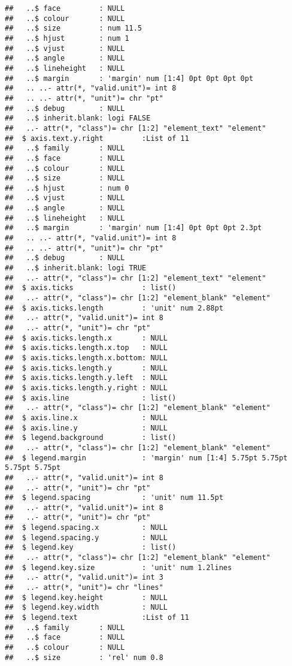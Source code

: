 \documentclass[
]{article}
\begin{document}
\begin{verbatim}
##   ..$ face         : NULL
##   ..$ colour       : NULL
##   ..$ size         : num 11.5
##   ..$ hjust        : num 1
##   ..$ vjust        : NULL
##   ..$ angle        : NULL
##   ..$ lineheight   : NULL
##   ..$ margin       : 'margin' num [1:4] 0pt 0pt 0pt 0pt
##   .. ..- attr(*, "valid.unit")= int 8
##   .. ..- attr(*, "unit")= chr "pt"
##   ..$ debug        : NULL
##   ..$ inherit.blank: logi FALSE
##   ..- attr(*, "class")= chr [1:2] "element_text" "element"
##  $ axis.text.y.right         :List of 11
##   ..$ family       : NULL
##   ..$ face         : NULL
##   ..$ colour       : NULL
##   ..$ size         : NULL
##   ..$ hjust        : num 0
##   ..$ vjust        : NULL
##   ..$ angle        : NULL
##   ..$ lineheight   : NULL
##   ..$ margin       : 'margin' num [1:4] 0pt 0pt 0pt 2.3pt
##   .. ..- attr(*, "valid.unit")= int 8
##   .. ..- attr(*, "unit")= chr "pt"
##   ..$ debug        : NULL
##   ..$ inherit.blank: logi TRUE
##   ..- attr(*, "class")= chr [1:2] "element_text" "element"
##  $ axis.ticks                : list()
##   ..- attr(*, "class")= chr [1:2] "element_blank" "element"
##  $ axis.ticks.length         : 'unit' num 2.88pt
##   ..- attr(*, "valid.unit")= int 8
##   ..- attr(*, "unit")= chr "pt"
##  $ axis.ticks.length.x       : NULL
##  $ axis.ticks.length.x.top   : NULL
##  $ axis.ticks.length.x.bottom: NULL
##  $ axis.ticks.length.y       : NULL
##  $ axis.ticks.length.y.left  : NULL
##  $ axis.ticks.length.y.right : NULL
##  $ axis.line                 : list()
##   ..- attr(*, "class")= chr [1:2] "element_blank" "element"
##  $ axis.line.x               : NULL
##  $ axis.line.y               : NULL
##  $ legend.background         : list()
##   ..- attr(*, "class")= chr [1:2] "element_blank" "element"
##  $ legend.margin             : 'margin' num [1:4] 5.75pt 5.75pt 5.75pt 5.75pt
##   ..- attr(*, "valid.unit")= int 8
##   ..- attr(*, "unit")= chr "pt"
##  $ legend.spacing            : 'unit' num 11.5pt
##   ..- attr(*, "valid.unit")= int 8
##   ..- attr(*, "unit")= chr "pt"
##  $ legend.spacing.x          : NULL
##  $ legend.spacing.y          : NULL
##  $ legend.key                : list()
##   ..- attr(*, "class")= chr [1:2] "element_blank" "element"
##  $ legend.key.size           : 'unit' num 1.2lines
##   ..- attr(*, "valid.unit")= int 3
##   ..- attr(*, "unit")= chr "lines"
##  $ legend.key.height         : NULL
##  $ legend.key.width          : NULL
##  $ legend.text               :List of 11
##   ..$ family       : NULL
##   ..$ face         : NULL
##   ..$ colour       : NULL
##   ..$ size         : 'rel' num 0.8

\end{verbatim}
\end{document}
